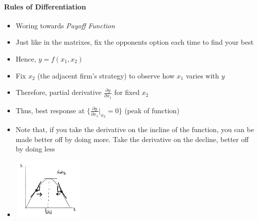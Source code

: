 \documentclass[11pt, english]{article}
\begin{document}
		\paragraph{Rules of Differentiation}

	\begin{itemize}
	\setlength\itemsep{0cm}
		\item Woring towards \textit{Payoff Function}
		\item Just like in the matrixes, fix the opponents option each time to find your best
		\item Hence, $y=f(x_1,x_2)$
		\item Fix $x_2$ (the adjacent firm's strategy) to observe how $x_1$ varies with $y$
		\item Therefore, partial derivative $\frac{\partial y}{\partial x_1}$ for fixed $x_2$
		\item Thus, best response at $\{\frac{\partial y}{\partial x_1}|_{x_2}=0\}$ (peak of function)
		\item Note that, if you take the derivative on the incline of the function, you can be made better off by doing more. Take the derivative on the decline, better off by doing less
		\item \includegraphics[width=3.5cm,height=3cm]{EC315-IMG/14.png}
	\end{itemize}
\end{document}
